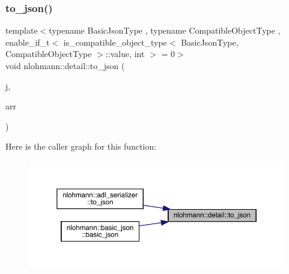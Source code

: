 \subsubsection{\texorpdfstring{to\_json()}{to\_json()}\hspace{0.1cm}{\footnotesize\ttfamily [8/8]}}
{\footnotesize\ttfamily template$<$typename Basic\+Json\+Type , typename Compatible\+Object\+Type , enable\+\_\+if\+\_\+t$<$ is\+\_\+compatible\+\_\+object\+\_\+type$<$ Basic\+Json\+Type, Compatible\+Object\+Type $>$\+::value, int $>$  = 0$>$ \\
void nlohmann\+::detail\+::to\+\_\+json (\begin{DoxyParamCaption}\item[{Basic\+Json\+Type \&}]{j,  }\item[{const Compatible\+Object\+Type \&}]{arr }\end{DoxyParamCaption})}

Here is the caller graph for this function\+:\nopagebreak
\begin{figure}[H]
\begin{center}
\leavevmode
\includegraphics[width=350pt]{namespacenlohmann_1_1detail_a6fa2f784014bfc0b62d7a35d51e676c9_icgraph}
\end{center}
\end{figure}
